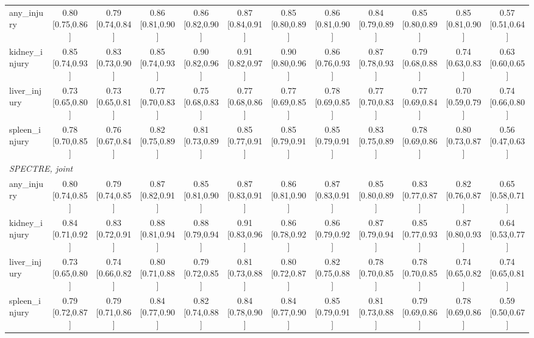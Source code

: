 \begin{tabular}{lccccccccccc}
any\_injury & 0.80 [0.75,0.86] & 0.79 [0.74,0.84] & 0.86 [0.81,0.90] & 0.86 [0.82,0.90] & 0.87 [0.84,0.91] & 0.85 [0.80,0.89] & 0.86 [0.81,0.90] & 0.84 [0.79,0.89] & 0.85 [0.80,0.89] & 0.85 [0.81,0.90] & 0.57 [0.51,0.64] \\
kidney\_injury & 0.85 [0.74,0.93] & 0.83 [0.73,0.90] & 0.85 [0.74,0.93] & 0.90 [0.82,0.96] & 0.91 [0.82,0.97] & 0.90 [0.80,0.96] & 0.86 [0.76,0.93] & 0.87 [0.78,0.93] & 0.79 [0.68,0.88] & 0.74 [0.63,0.83] & 0.63 [0.60,0.65] \\
liver\_injury & 0.73 [0.65,0.80] & 0.73 [0.65,0.81] & 0.77 [0.70,0.83] & 0.75 [0.68,0.83] & 0.77 [0.68,0.86] & 0.77 [0.69,0.85] & 0.78 [0.69,0.85] & 0.77 [0.70,0.83] & 0.77 [0.69,0.84] & 0.70 [0.59,0.79] & 0.74 [0.66,0.80] \\
spleen\_injury & 0.78 [0.70,0.85] & 0.76 [0.67,0.84] & 0.82 [0.75,0.89] & 0.81 [0.73,0.89] & 0.85 [0.77,0.91] & 0.85 [0.79,0.91] & 0.85 [0.79,0.91] & 0.83 [0.75,0.89] & 0.78 [0.69,0.86] & 0.80 [0.73,0.87] & 0.56 [0.47,0.63] \\
\multicolumn{12}{l}{\textit{SPECTRE, joint}} \\
any\_injury & 0.80 [0.74,0.85] & 0.79 [0.74,0.85] & 0.87 [0.82,0.91] & 0.85 [0.81,0.90] & 0.87 [0.83,0.91] & 0.86 [0.81,0.90] & 0.87 [0.83,0.91] & 0.85 [0.80,0.89] & 0.83 [0.77,0.87] & 0.82 [0.76,0.87] & 0.65 [0.58,0.71] \\
kidney\_injury & 0.84 [0.71,0.92] & 0.83 [0.72,0.91] & 0.88 [0.81,0.94] & 0.88 [0.79,0.94] & 0.91 [0.83,0.96] & 0.86 [0.78,0.92] & 0.86 [0.79,0.92] & 0.87 [0.79,0.94] & 0.85 [0.77,0.93] & 0.87 [0.80,0.93] & 0.64 [0.53,0.77] \\
liver\_injury & 0.73 [0.65,0.80] & 0.74 [0.66,0.82] & 0.80 [0.71,0.88] & 0.79 [0.72,0.85] & 0.81 [0.73,0.88] & 0.80 [0.72,0.87] & 0.82 [0.75,0.88] & 0.78 [0.70,0.85] & 0.78 [0.70,0.85] & 0.74 [0.65,0.82] & 0.74 [0.65,0.81] \\
spleen\_injury & 0.79 [0.72,0.87] & 0.79 [0.71,0.86] & 0.84 [0.77,0.90] & 0.82 [0.74,0.88] & 0.84 [0.78,0.90] & 0.84 [0.77,0.90] & 0.85 [0.79,0.91] & 0.81 [0.73,0.88] & 0.79 [0.69,0.86] & 0.78 [0.69,0.86] & 0.59 [0.50,0.67] \\
\bottomrule
\end{tabular}
